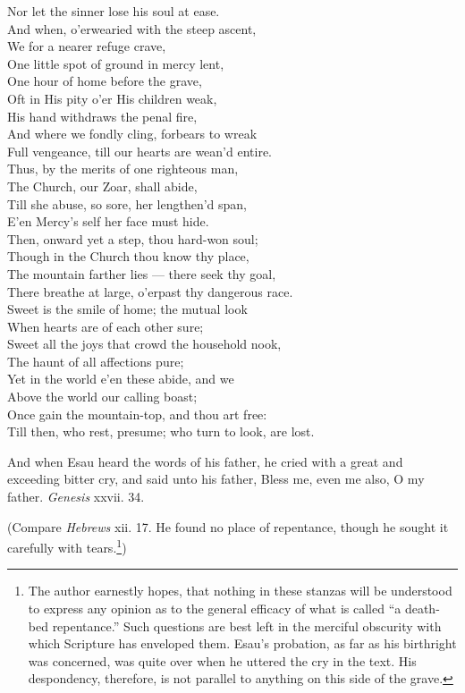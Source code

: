  Nor let the sinner lose his soul at ease. \\
  And when, o’erwearied with the steep ascent, \\
 We for a nearer refuge crave, \\
 One little spot of ground in mercy lent, \\
 One hour of home before the grave, \\
 Oft in His pity o’er His children weak, \\
 His hand withdraws the penal fire, \\
 And where we fondly cling, forbears to wreak \\
 Full vengeance, till our hearts are wean’d entire. \\
  Thus, by the merits of one righteous man, \\
 The Church, our Zoar, shall abide, \\
 Till she abuse, so sore, her lengthen’d span, \\
 E’en Mercy’s self her face must hide. \\
 Then, onward yet a step, thou hard-won soul; \\
 Though in the Church thou know thy place, \\
 The mountain farther lies — there seek thy goal, \\
 There breathe at large, o’erpast thy dangerous race. \\
  Sweet is the smile of home; the mutual look \\
 When hearts are of each other sure; \\
 Sweet all the joys that crowd the household nook, \\
 The haunt of all affections pure; \\
 Yet in the world e’en these abide, and we \\
 Above the world our calling boast; \\
 Once gain the mountain-top, and thou art free: \\
 Till then, who rest, presume; who turn to look, are lost.\\


And when Esau heard the words of his father, he cried with a great and exceeding bitter cry, and said unto his father, Bless me, even me also, O my father. \emph{Genesis} xxvii. 34.

(Compare \emph{Hebrews} xii. 17. He found no place of repentance, though he sought it carefully with tears.\footnote{The author earnestly hopes, that nothing in these stanzas will be understood to express any opinion as to the general efficacy of what is called “a death-bed repentance.” Such questions are best left in the merciful obscurity with which Scripture has enveloped them. Esau’s probation, as far as his birthright was concerned, was quite over when he uttered the cry in the text. His despondency, therefore, is not parallel to anything on this side of the grave.})

